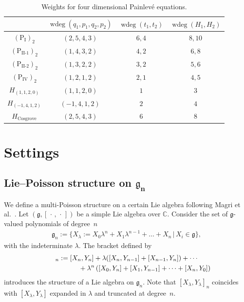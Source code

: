 \documentclass[pdftex]{sigma}
\numberwithin{equation}{section}
\begin{document}
\begin{table}[h]\centering\caption{Weights for four dimensional Painlev\'{e} equations.}\label{table2}\vspace{1mm}
\begin{tabular}{|c||c|c|c|}
\hline
 & $\operatorname{wdeg}(q_1,p_1,q_2,p_2)$ & $\operatorname{wdeg} (t_1, t_2)$ & $\operatorname{wdeg} (H_1, H_2)$ \\ \hline \hline
$(\text{P}_\text{I})_2$ & $(2,5,4,3)$ & $6,4$ & $8,10$ \\ \hline
$(\text{P}_\text{II-1})_2$ & $(1,4,3,2)$ & $4,2$ & $6,8$ \\ \hline
$(\text{P}_\text{II-2})_2$ & $(1,3,2,2)$ & $3,2$ & $5,6$ \\ \hline
$(\text{P}_\text{IV})_2$ & $(1,2,1,2)$ & $2,1$ & $4,5$ \\ \hline
$H_{(1,1,2,0)}$ & $(1,1,2,0)$ & $1$ & $3$ \\ \hline
$H_{(-1,4,1,2)}$ & $(-1,4,1,2)$ & $2$ & $4$ \\ \hline
$H_{\text{Cosgrove}}$ & $(2,5,4,3)$ & $6$ & $8$ \\ \hline
\end{tabular}
\end{table}

\section{Settings}\label{section2}

\subsection[Lie--Poisson structure on $\mathfrak{g}_n$]{Lie--Poisson structure on $\boldsymbol{\mathfrak{g}_n}$}\label{section2.1}

We def\/ine a multi-Poisson structure on a certain Lie algebra following Magri et al.~\cite{Mag1,Mag2,Mag3,Mag4}. Let $(\mathfrak{g}, [\, \cdot \,, \,\cdot \,])$ be a simple Lie algebra over $\mathbb{C}$. Consider the set of $\mathfrak{g}$-valued polynomials of degree~$n$
\begin{gather*}
\mathfrak{g}_n:= \big\{ X_\lambda := X_0 \lambda ^n + X_1\lambda ^{n-1} + \dots + X_n \, | \, X_i\in \mathfrak{g}\big\},
\end{gather*}
with the indeterminate $\lambda $. The bracket def\/ined by
\begin{gather*}
[X_\lambda ,Y_\lambda ]_n := [X_n, Y_n] + \lambda ([X_n, Y_{n-1}] + [X_{n-1}, Y_n]) + \cdots \\
\hphantom{[X_\lambda ,Y_\lambda ]_n :=}{} + \lambda ^n \left( [X_0, Y_n] + [X_1, Y_{n-1}] + \dots + [X_n, Y_0] \right)
\end{gather*}
introduces the structure of a Lie algebra on $\mathfrak{g}_n$. Note that $[X_\lambda , Y_\lambda ]_n$ coincides with $[X_\lambda , Y_\lambda ]$ expanded in $\lambda $ and truncated at degree~$n$.
\end{document}
